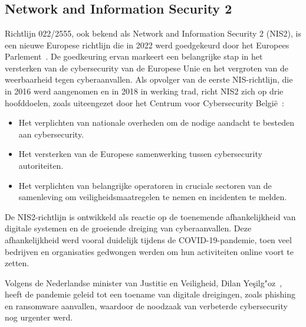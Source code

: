 \chapter{}%
\label{ch:stand-van-zaken}



\section{Network and Information Security 2}%
\label{sec:nis2}

Richtlijn 022/2555, ook bekend als Network and Information Security 2 (NIS2), is een nieuwe Europese richtlijn die in 2022 werd goedgekeurd door het Europees Parlement~\autocite{nis2-eu-be}.
De goedkeuring ervan markeert een belangrijke stap in het versterken van de cybersecurity van de Europese Unie en het vergroten van de weerbaarheid tegen cyberaanvallen.
Als opvolger van de eerste NIS-richtlijn, die in 2016 werd aangenomen en in 2018 in werking trad, richt NIS2 zich op drie hoofddoelen, zoals uiteengezet door het Centrum voor Cybersecurity Belgi\"e~\autocite{nis2-eu-be}:

\begin{itemize}
    \item Het verplichten van nationale overheden om de nodige aandacht te besteden aan cybersecurity.
    \item Het versterken van de Europese samenwerking tussen cybersecurity autoriteiten.
    \item Het verplichten van belangrijke operatoren in cruciale sectoren van de samenleving om veiligheidsmaatregelen te nemen en incidenten te melden.
\end{itemize}

De NIS2-richtlijn is ontwikkeld als reactie op de toenemende afhankelijkheid van digitale systemen en de groeiende dreiging van cyberaanvallen.
Deze afhankelijkheid werd vooral duidelijk tijdens de COVID-19-pandemie, toen veel bedrijven en organisaties gedwongen werden om hun activiteiten online voort te zetten.

Volgens de Nederlandse minister van Justitie en Veiligheid, Dilan Ye\c{s}ilg"oz~\autocite{yesilgoz2022nis}, heeft de pandemie geleid tot een toename van digitale dreigingen, zoals phishing en ransomware aanvallen, waardoor de noodzaak van verbeterde cybersecurity nog urgenter werd.

